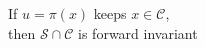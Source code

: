 \documentclass[preview]{standalone}
\begin{document}
\begin{center}
If $u = \pi(x)$ keeps $x \in \mathcal{C}$,\\then $\mathcal{S} \cap \mathcal{C}$ is forward invariant
\end{center}
\end{document}

